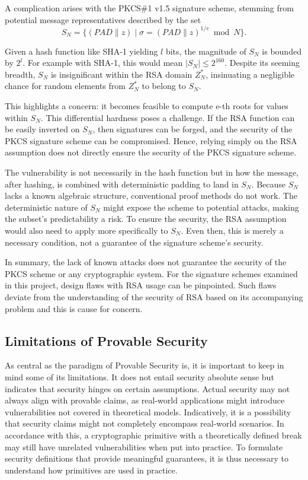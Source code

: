 \documentclass[]{final_report}
\theoremstyle{definition}
\begin{document}
A complication arises with the PKCS\#1 v1.5 signature scheme, stemming from potential message representatives described by the set
\[ S_N = \{ (PAD \| z) \mid \sigma = (PAD \| z)^{1/e} \bmod N \}. \]

Given a hash function like SHA-1 yielding $l$ bits, the magnitude of $S_N$ is bounded by $2^l$. For example with SHA-1, this would mean  $|S_N| \leq 2^{160}$. Despite its seeming breadth, $S_N$ is insignificant within the RSA domain \( Z_N^* \), insinuating a negligible chance for random elements from \( Z_N^* \) to belong to \( S_N \).

This highlights a concern: it becomes feasible to compute e-th roots for values within $S_N$. This differential hardness poses a challenge. If the RSA function can be easily inverted on  $S_N$, then signatures can be forged, and the security of the PKCS signature scheme can be compromised. Hence, relying simply on the RSA assumption does not directly ensure the security of the PKCS signature scheme. 

The vulnerability is not necessarily in the hash function but in how the message, after hashing, is combined with deterministic padding to land in \( S_N \). Because \( S_N \) lacks a known algebraic structure, conventional proof methods do not work. The deterministic nature of \( S_N \) might expose the scheme to potential attacks, making the subset's predictability a risk. To ensure the security, the RSA assumption would also need to apply more specifically to  $S_N$. Even then, this is merely a necessary condition, not a guarantee of the signature scheme's security. 

In summary, the lack of known attacks does not guarantee the security of the PKCS scheme or any cryptographic system. For the signature schemes examined in this project, design flaws with RSA usage can be pinpointed. Such flaws deviate from the understanding of the security of RSA based on its accompanying problem and this is cause for concern.


\subsection{Limitations of Provable Security}
As central as the paradigm of Provable Security is, it is important to keep in mind some of its limitations. It does not entail security absolute sense but indicates that security hinges on certain assumptions. Actual security may not always align with provable claims, as real-world applications might introduce vulnerabilities not covered in theoretical models. Indicatively, it is a possibility that security claims might not completely encompass real-world scenarios. In accordance with this, a cryptographic primitive with a theoretically defined break may still have unrelated vulnerabilities when put into practice. To formulate security definitions that provide meaningful guarantees, it is thus necessary to understand how primitives are used in practice.
\end{document}
